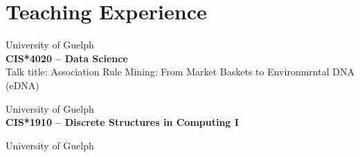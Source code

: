 \section{Teaching Experience}
University of Guelph\\
\textbf{CIS*4020 -- Data Science}\\
Talk title: Association Rule Mining: From Market Baskets to Environmrntal DNA (eDNA)


\medskip
{}
University of Guelph\\
\textbf{CIS*1910 -- Discrete Structures in Computing I}

\medskip
{}
University of Guelph\\

